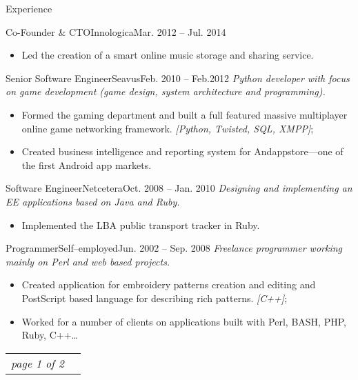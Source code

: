 \documentclass[]{mcdowellcv}
\begin{document}
\begin{cvsection}{Experience}
\begin{cvsubsection}{Co-Founder \& CTO}{Innologica}{Mar. 2012 -- Jul. 2014}
\begin{itemize}
                \item Led the creation of a smart online music storage and sharing service.
            \end{itemize}
        \end{cvsubsection}
        \begin{cvsubsection}{Senior Software Engineer}{Seavus}{Feb. 2010 -- Feb.2012}
            \textit{Python developer with focus on game development (game design, system architecture and programming).}
            \begin{itemize}
                \item Formed the gaming department and built a full featured massive multiplayer online game networking framework.
                    \textit{[Python, Twisted, SQL, XMPP]};
                \item Created business intelligence and reporting system for Andappstore---one of the first Android app markets.
            \end{itemize}
        \end{cvsubsection}
        \begin{cvsubsection}{Software Engineer}{Netcetera}{Oct. 2008 -- Jan. 2010}
            \textit{Designing and implementing an EE applications based on Java and Ruby.}
            \begin{itemize}
                \item Implemented the LBA public transport tracker in Ruby.
            \end{itemize}
        \end{cvsubsection}
        \begin{cvsubsection}{Programmer}{Self--employed}{Jun. 2002 -- Sep. 2008}
            \textit{Freelance programmer working mainly on Perl and web based projects.}
            \begin{itemize}
                \item Created application for embroidery patterns creation and editing and PostScript based language for describing rich patterns.
                    \textit{[C++]};
                \item Worked for a number of clients on applications built with Perl, BASH, PHP, Ruby, C++\ldots
            \end{itemize}
        \end{cvsubsection}
    \end{cvsection}

    \vfill
    \begin{tabu} to 1\textwidth {X[l,m] X[r,m]}
        \textit{page 1 of 2}
    \end{tabu}
    \clearpage
\end{document}
